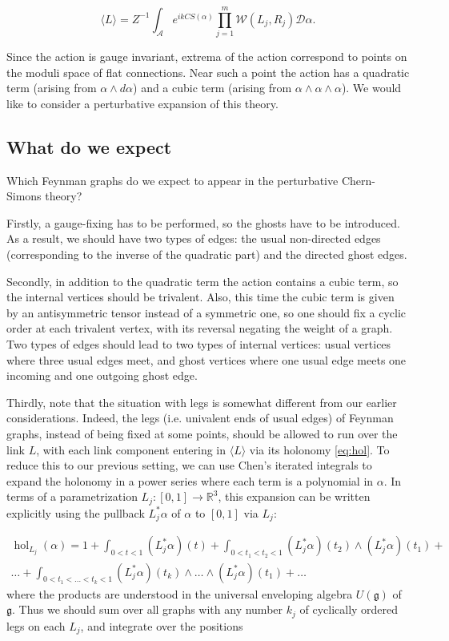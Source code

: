 \documentclass[10pt]{amsart}
\theoremstyle{definition}
\theoremstyle{remark}
\newcommand{\R}{\mathbb R}
\def\<{\langle}
\def\>{\rangle}
\newcommand{\cA}{\mathcal{A}}
\newcommand{\cD}{\mathcal{D}}
\newcommand{\cW}{\mathcal{W}}
\newcommand{\fG}{\mathfrak{g}}
\newcommand{\Ga}{\alpha}
\newcommand{\hol}{\operatorname{hol}}
\begin{document}
\begin{equation}\label{eqW}
\<L\>=Z^{-1} \int_{\cA} e^{ikCS(\Ga)}
\prod_{j=1}^m{\cW}(L_j,R_j)\cD\Ga.
\end{equation}

Since the action is gauge invariant, extrema of the action
correspond to points on the moduli space of flat connections.
Near such a point the action has a quadratic term (arising
from $\Ga\wedge d\Ga$) and a cubic term (arising from
$\Ga\wedge\Ga\wedge\Ga$).
We would like to consider a perturbative expansion of this theory.


\subsection{What do we expect}
Which Feynman graphs do we expect to appear in the perturbative
Chern-Simons theory?

Firstly, a gauge-fixing has to be performed, so the ghosts have to
be introduced. As a result, we should have two types of edges:
the usual non-directed edges (corresponding to the inverse of the
quadratic part) and the directed ghost edges.

Secondly, in addition to the quadratic term the action contains a
cubic term, so the internal vertices should be trivalent.
Also, this time the cubic term is given by an antisymmetric tensor
instead of a symmetric one, so one should fix a cyclic order at each
trivalent vertex, with its reversal negating the weight of a graph.
Two types of edges should lead to two types of internal vertices:
usual vertices where three usual edges meet, and ghost vertices
where one usual edge meets one incoming and one outgoing ghost
edge.

Thirdly, note that the situation with legs is somewhat different
from our earlier considerations. Indeed, the legs (i.e. univalent
ends of usual edges) of Feynman graphs, instead of being fixed at
some points, should be  allowed to run over the link $L$,
with each link component entering in $\<L\>$ via its holonomy
\eqref{eq:hol}. To reduce this to our previous setting, we can
use Chen's iterated integrals to expand the holonomy in a power
series where each term is a polynomial in $\Ga$. In terms of a
parametrization $L_j:[0,1]\to\R^3$, this expansion can be written
explicitly using the pullback $L_j^*\Ga$ of $\Ga$ to $[0,1]$ via
$L_j$:

\begin{multline*}
\hol_{L_j}(\Ga)=1+\int_{0<t<1}(L_j^*\Ga)(t)+
\int_{0<t_1<t_2<1} (L_j^*\Ga)(t_2) \wedge (L_j^*\Ga)(t_1)+\\ \dots +
 \int_{0<t_1<\dots<t_k<1} (L_j^*\Ga)(t_k)\wedge \dots \wedge (L_j^*\Ga)(t_1)+\dots
\end{multline*}
where the products are understood in the universal enveloping
algebra $U(\fG)$ of $\fG$. Thus we should sum over all graphs with
any number $k_j$ of cyclically ordered legs on each $L_j$, and
integrate over the positions
\end{document}
